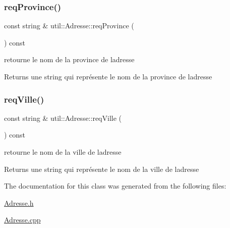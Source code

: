 \subsubsection{\texorpdfstring{req\+Province()}{reqProvince()}}
{\footnotesize\ttfamily const string \& util\+::\+Adresse\+::req\+Province (\begin{DoxyParamCaption}{ }\end{DoxyParamCaption}) const}



retourne le nom de la province de l\textquotesingle{}adresse 

\begin{DoxyReturn}{Returns}
une string qui représente le nom de la province de l\textquotesingle{}adresse 
\end{DoxyReturn}
\mbox{\label{classutil_1_1Adresse_a084353601fe763f34dba9ca03af5abe2}} 
\subsubsection{\texorpdfstring{req\+Ville()}{reqVille()}}
{\footnotesize\ttfamily const string \& util\+::\+Adresse\+::req\+Ville (\begin{DoxyParamCaption}{ }\end{DoxyParamCaption}) const}



retourne le nom de la ville de l\textquotesingle{}adresse 

\begin{DoxyReturn}{Returns}
une string qui représente le nom de la ville de l\textquotesingle{}adresse 
\end{DoxyReturn}


The documentation for this class was generated from the following files\+:\begin{DoxyCompactItemize}
\item 
\hyperlink{Adresse_8h}{Adresse.\+h}\item 
\hyperlink{Adresse_8cpp}{Adresse.\+cpp}\end{DoxyCompactItemize}
